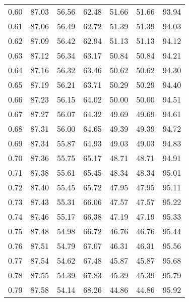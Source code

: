 \begin{tabular}{|c|c|c|c|c|c|c|}
      0.60 &     87.03 &     56.56 &      62.48 &   51.66 &      51.66 &         93.94 \\
      0.61 &     87.06 &     56.49 &      62.72 &   51.39 &      51.39 &         94.03 \\
      0.62 &     87.09 &     56.42 &      62.94 &   51.13 &      51.13 &         94.12 \\
      0.63 &     87.12 &     56.34 &      63.17 &   50.84 &      50.84 &         94.21 \\
      0.64 &     87.16 &     56.32 &      63.46 &   50.62 &      50.62 &         94.30 \\
      0.65 &     87.19 &     56.21 &      63.71 &   50.29 &      50.29 &         94.40 \\
      0.66 &     87.23 &     56.15 &      64.02 &   50.00 &      50.00 &         94.51 \\
      0.67 &     87.27 &     56.07 &      64.32 &   49.69 &      49.69 &         94.61 \\
      0.68 &     87.31 &     56.00 &      64.65 &   49.39 &      49.39 &         94.72 \\
      0.69 &     87.34 &     55.87 &      64.93 &   49.03 &      49.03 &         94.83 \\
      0.70 &     87.36 &     55.75 &      65.17 &   48.71 &      48.71 &         94.91 \\
      0.71 &     87.38 &     55.61 &      65.45 &   48.34 &      48.34 &         95.01 \\
      0.72 &     87.40 &     55.45 &      65.72 &   47.95 &      47.95 &         95.11 \\
      0.73 &     87.43 &     55.31 &      66.06 &   47.57 &      47.57 &         95.22 \\
      0.74 &     87.46 &     55.17 &      66.38 &   47.19 &      47.19 &         95.33 \\
      0.75 &     87.48 &     54.98 &      66.72 &   46.76 &      46.76 &         95.44 \\
      0.76 &     87.51 &     54.79 &      67.07 &   46.31 &      46.31 &         95.56 \\
      0.77 &     87.54 &     54.62 &      67.48 &   45.87 &      45.87 &         95.68 \\
      0.78 &     87.55 &     54.39 &      67.83 &   45.39 &      45.39 &         95.79 \\
      0.79 &     87.58 &     54.14 &      68.26 &   44.86 &      44.86 &         95.92 \\

\end{tabular}
